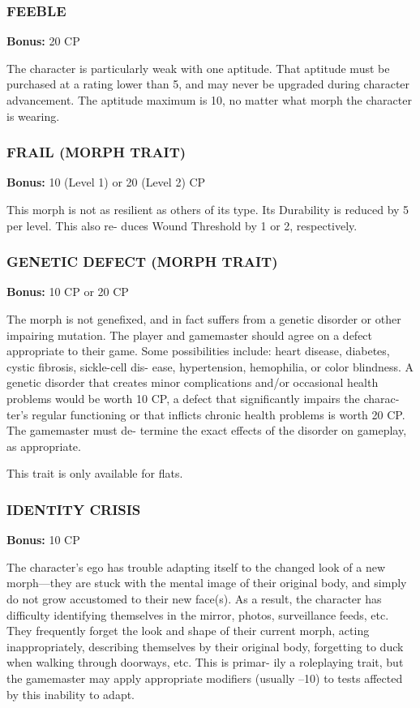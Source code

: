 \subsubsection{FEEBLE}
\textbf{Bonus:} 20 CP

The character is particularly weak with one aptitude.
That aptitude must be purchased at a rating lower
than 5, and may never be upgraded during character
advancement. The aptitude maximum is 10, no matter
what morph the character is wearing.

\subsubsection{FRAIL (MORPH TRAIT)}
\textbf{Bonus:} 10 (Level 1) or 20 (Level 2) CP

This morph is not as resilient as others of its type.
Its Durability is reduced by 5 per level. This also re-
duces Wound Threshold by 1 or 2, respectively.

\subsubsection{GENETIC DEFECT (MORPH TRAIT)}
\textbf{Bonus:} 10 CP or 20 CP

The morph is not genefixed, and in fact suffers
from a genetic disorder or other impairing mutation.
The player and gamemaster should agree on a defect
appropriate to their game. Some possibilities include:
heart disease, diabetes, cystic fibrosis, sickle-cell dis-
ease, hypertension, hemophilia, or color blindness.
A genetic disorder that creates minor complications
and/or occasional health problems would be worth
10 CP, a defect that significantly impairs the charac-
ter’s regular functioning or that inflicts chronic health
problems is worth 20 CP. The gamemaster must de-
termine the exact effects of the disorder on gameplay,
as appropriate.

This trait is only available for flats.

\subsubsection{IDENTITY CRISIS}
\textbf{Bonus:} 10 CP

The character’s ego has trouble adapting itself to
the changed look of a new morph—they are stuck
with the mental image of their original body, and
simply do not grow accustomed to their new face(s).
As a result, the character has difficulty identifying
themselves in the mirror, photos, surveillance feeds,
etc. They frequently forget the look and shape of their
current morph, acting inappropriately, describing
themselves by their original body, forgetting to duck
when walking through doorways, etc. This is primar-
ily a roleplaying trait, but the gamemaster may apply
appropriate modifiers (usually –10) to tests affected
by this inability to adapt.

